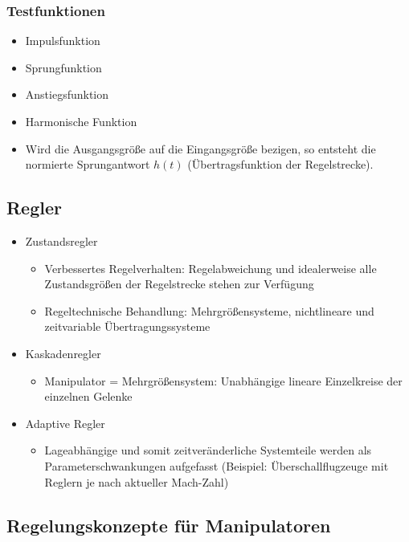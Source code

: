 \documentclass[paper=a4, fontsize=11pt]{scrartcl} %
\numberwithin{equation}{section} %
\numberwithin{figure}{section} %
\numberwithin{table}{section} %
\begin{document}
\subsubsection{Testfunktionen}

\begin{itemize}
\item Impulsfunktion
\item Sprungfunktion
\item Anstiegsfunktion
\item Harmonische Funktion
\item Wird die Ausgangsgröße auf die Eingangsgröße bezigen, so entsteht die normierte Sprungantwort $h(t)$ (Übertragsfunktion der Regelstrecke).
\end{itemize}

\subsection{Regler}

\begin{itemize}
\item Zustandsregler
\begin{itemize}
\item Verbessertes Regelverhalten: Regelabweichung und idealerweise alle Zustandsgrößen der Regelstrecke stehen zur Verfügung
\item Regeltechnische Behandlung: Mehrgrößensysteme, nichtlineare und zeitvariable Übertragungssysteme
\end{itemize}
\item Kaskadenregler
\begin{itemize}
\item Manipulator = Mehrgrößensystem: Unabhängige lineare Einzelkreise der einzelnen Gelenke
\end{itemize}
\item Adaptive Regler
\begin{itemize}
\item Lageabhängige und somit zeitveränderliche Systemteile werden als Parameterschwankungen aufgefasst (Beispiel: Überschallflugzeuge mit Reglern je nach aktueller Mach-Zahl)
\end{itemize}
\end{itemize}

\subsection{Regelungskonzepte für Manipulatoren}
\end{document}
